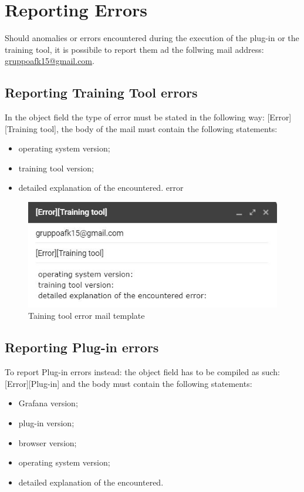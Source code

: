 \section{Reporting Errors}
Should anomalies or errors encountered during the execution of the plug-in or the training tool, it is possibile to report them ad the follwing mail address: \href{mailto:gruppoafk15@gmail.com}{gruppoafk15@gmail.com}.

\subsection{Reporting Training Tool errors}
In the object field the type of error must be stated in the following way: [Error][Training tool],
the body of the mail must contain the  following statements:

\begin{itemize}
	\item operating system version;
	\item training tool version;
	\item detailed explanation of the encountered. error
\end{itemize}

\begin{figure}[H]
\centering
\includegraphics[scale=0.85]{img/mail/tool_mail.jpg}
\caption{Taining tool error mail template}
\end{figure}

\subsection{Reporting Plug-in errors}
To report Plug-in errors instead: the object field has to be compiled as such: [Error][Plug-in] and the body must contain the following statements:
\begin{itemize}
\item Grafana version;
\item plug-in version;
\item browser version;
\item operating system version;
\item  detailed explanation of the encountered.
\end{itemize}

